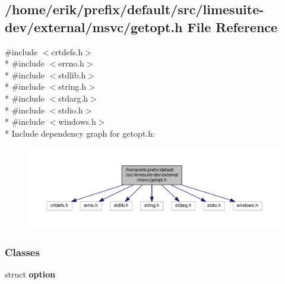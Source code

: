 \subsection{/home/erik/prefix/default/src/limesuite-\/dev/external/msvc/getopt.h File Reference}
\label{limesuite-dev_2external_2msvc_2getopt_8h}
{\ttfamily \#include $<$crtdefs.\+h$>$}\\*
{\ttfamily \#include $<$errno.\+h$>$}\\*
{\ttfamily \#include $<$stdlib.\+h$>$}\\*
{\ttfamily \#include $<$string.\+h$>$}\\*
{\ttfamily \#include $<$stdarg.\+h$>$}\\*
{\ttfamily \#include $<$stdio.\+h$>$}\\*
{\ttfamily \#include $<$windows.\+h$>$}\\*
Include dependency graph for getopt.\+h\+:
\nopagebreak
\begin{figure}[H]
\begin{center}
\leavevmode
\includegraphics[width=350pt]{d8/de1/limesuite-dev_2external_2msvc_2getopt_8h__incl}
\end{center}
\end{figure}
\subsubsection*{Classes}
\begin{DoxyCompactItemize}
\item 
struct {\bf option}
\end{DoxyCompactItemize}
